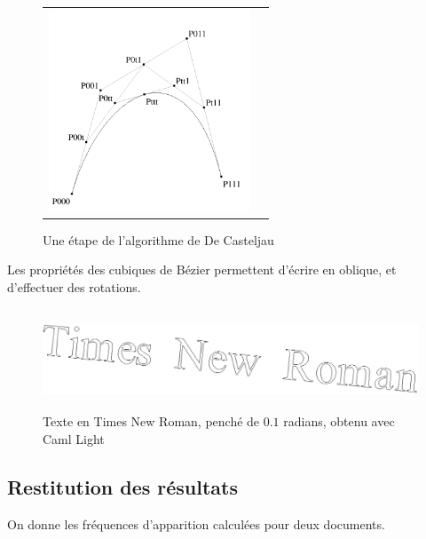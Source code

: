 \documentclass[10pt,twoside,french,a4paper]{article}
\begin{document}
\begin{figure}[h]
\begin{center}
\begin{tabular}{cc}
      \includegraphics[height=6cm]{Ressources/pdf/f4.pdf} \\
    \end{tabular}
    \caption{Une étape de l'algorithme de De Casteljau}
  \end{center}
\end{figure}

\medskip

Les propriétés des cubiques de Bézier permettent d'écrire en oblique, et d'effectuer des rotations.

\begin{figure}[h]
  \begin{center}
    \includegraphics[height=3cm]{Ressources/Images/TimesNewRoman.png}
    \caption{Texte en Times New Roman, penché de $0.1$ radians, obtenu avec Caml Light}
  \end{center}
\end{figure}

\pagebreak

\subsection{Restitution des résultats}

On donne les fréquences d'apparition calculées pour deux documents.

\medskip
\end{document}
